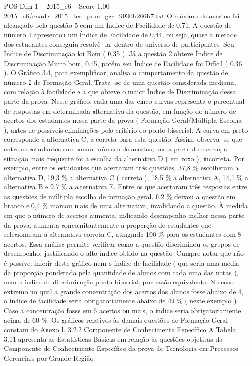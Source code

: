\begin{textsample}{POS Dim 1 – 2015\_c6 – Score 1.00 – 2015\_c6/enade\_2015\_tec\_proc\_ger\_9930b266b7.txt}
O máximo de acertos foi alcançado pela questão 5 com um Índice de Facilidade de 0,71.
A questão de número 1 apresentou um Índice de Facilidade de 0,44, ou seja, quase a metade dos estudantes conseguiu resolvê -la, dentro do universo de participantes.
Seu Índice de Discriminação foi Bom ( 0,35 ).
Já a questão 2 obteve Índice de Discriminação Muito bom, 0,45, porém seu Índice de Facilidade foi Difícil ( 0,36 ).
O Gráfico 3.4, para exemplificar, analisa o comportamento da questão de número 2 de Formação Geral.
Trata -se de uma questão considerada mediana, com relação à facilidade e a que obteve o maior Índice de Discriminação dessa parte da prova.
Neste gráfico, cada uma das cinco curvas representa o percentual de respostas em determinada alternativa da questão, em função do número de acertos dos estudantes nessa parte da prova ( Formação Geral/Múltipla Escolha ), antes de possíveis eliminações pelo critério do ponto bisserial.
A curva em preto corresponde à alternativa C, a correta para esta questão.
Assim, observa -se que entre os estudantes com menor número de acertos, nessa parte do exame, a situação mais frequente foi a escolha da alternativa D ( em roxo ), incorreta.
Por exemplo, entre os estudantes que acertaram três questões, 37,8 \% escolheram a alternativa D, 19,3 \% a alternativa C ( correta ), 18,5 \% a alternativa A, 14,1 \% a alternativa B e 9,7 \% a alternativa E.
Entre os que acertaram três respostas entre as questões de múltipla escolha de formação geral, 0,2 \% deixou a questão em branco e 0,4 \% marcou mais de uma alternativa, invalidando a questão.
À medida em que o número de acertos aumenta, indicando desempenho melhor nessa parte da prova, aumenta concomitantemente a proporção de estudantes que selecionaram a alternativa correta C, atingindo 100 \% para os estudantes com 8 acertos.
Essa análise permite verificar como a questão discriminou os grupos de desempenho, justificando o alto índice obtido na questão.
Cumpre notar que não é possível inferir deste gráfico nem o índice de facilidade ( que seria uma média da proporção ponderada pela quantidade de alunos com cada uma das notas ), nem o índice de discriminação ponto bisserial, por razão equivalente.
No caso extremo no qual a grande concentração dos acertos dos alunos fosse abaixo de 4, o índice de facilidade seria obrigatoriamente abaixo de 40 \% ( neste exemplo ).
Caso a concentração fosse em 6 acertos ou mais, o índice seria obrigatoriamente acima de 60 \%.
Os gráficos relativos às demais questões de Formação Geral constam do Anexo I. 3.2.2 Componente de Conhecimento Específico A Tabela 3.11 apresenta as Estatísticas Básicas em relação às questões objetivas do Componente de Conhecimento Específico da prova de Tecnologia em Processos Gerenciais por Grande Região.

\end{textsample}
